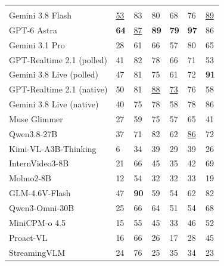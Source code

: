 \begingroup
\setlength{\tabcolsep}{0pt}
\renewcommand{\arraystretch}{1.02}
\fontsize{8.6}{10.7}\selectfont
\begin{tabular}{@{}L{.28\linewidth}K{ivgscreen}{.10\linewidth}K{ivgquality}{.124\linewidth}K{ivgquality}{.124\linewidth}K{ivgquality}{.124\linewidth}K{ivgquality}{.124\linewidth}K{ivgquality}{.124\linewidth}@{}}
\toprule
{} &  &  &  &  &  & \\
Gemini 3.8 Flash & \underline{53} & 83 & 80 & 68 & 76 & \underline{89}\\
GPT-6 Astra & \textbf{64} & \underline{87} & \textbf{89} & \textbf{79} & \textbf{97} & 86\\
Gemini 3.1 Pro & 28 & 61 & 66 & 57 & 80 & 65\\
GPT-Realtime 2.1 (polled) & 41 & 82 & 78 & 66 & 71 & 53\\
Gemini 3.8 Live (polled) & 47 & 81 & 75 & 61 & 72 & \textbf{91}\\
GPT-Realtime 2.1 (native) & 50 & 81 & \underline{88} & \underline{73} & 76 & 58\\
Gemini 3.8 Live (native) & 40 & 75 & 78 & 58 & 78 & 86\\
Muse Glimmer & 27 & 59 & 75 & 57 & 65 & 41\\
Qwen3.8-27B & 37 & 71 & 82 & 62 & \underline{86} & 72\\
Kimi-VL-A3B-Thinking & 6 & 34 & 39 & 29 & 39 & 26\\
InternVideo3-8B & 21 & 66 & 45 & 35 & 42 & 69\\
Molmo2-8B & 12 & 54 & 32 & 32 & 33 & 19\\
GLM-4.6V-Flash & 47 & \textbf{90} & 59 & 54 & 62 & 82\\
Qwen3-Omni-30B & 25 & 66 & 64 & 51 & 54 & 68\\
MiniCPM-o 4.5 & 15 & 55 & 45 & 33 & 46 & 52\\
Proact-VL & 16 & 66 & 26 & 17 & 28 & 45\\
StreamingVLM & 24 & 76 & 25 & 35 & 34 & 23\\
\bottomrule
\end{tabular}\par
\endgroup
{}
